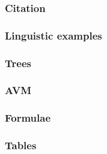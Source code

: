 




\begin{frame}
\frametitle{Citation}

\end{frame}

\begin{frame}
\frametitle{Linguistic examples}

\end{frame}

\begin{frame}
\frametitle{Trees}

\end{frame}

\begin{frame}
\frametitle{AVM}

\end{frame}

% 

\begin{frame}
\frametitle{Formulae}

\end{frame}

\begin{frame}
\frametitle{Tables}

\end{frame}